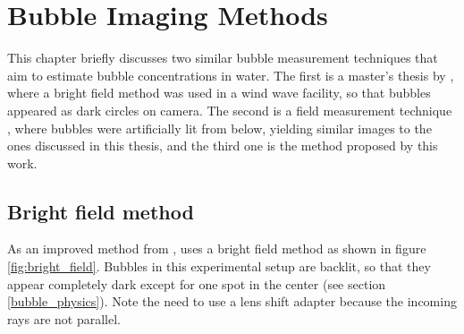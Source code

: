
\chapter{Bubble Imaging Methods} \label{related_work}
 

This chapter briefly discusses two similar bubble measurement techniques that aim to estimate bubble concentrations in water. The first is a master's thesis by \citet{Leonie}, where a bright field method was used in a wind wave facility, so that bubbles appeared as dark circles on camera. The second is a field measurement technique \citep{Al-Lashi2016}, where bubbles were artificially lit from below, yielding similar images to the ones discussed in this thesis, and the third one is the method proposed by this work. 

\section{Bright field method}
	As an improved method from \citet{MischlerDiss}, \citet{Leonie} uses a bright field method as shown in figure \ref{fig:bright_field}. Bubbles in this experimental setup are backlit, so that they appear completely dark except for one spot in the center (see section  \ref{bubble_physics}). Note the need to use a lens shift adapter because the incoming rays are not parallel. 
	
